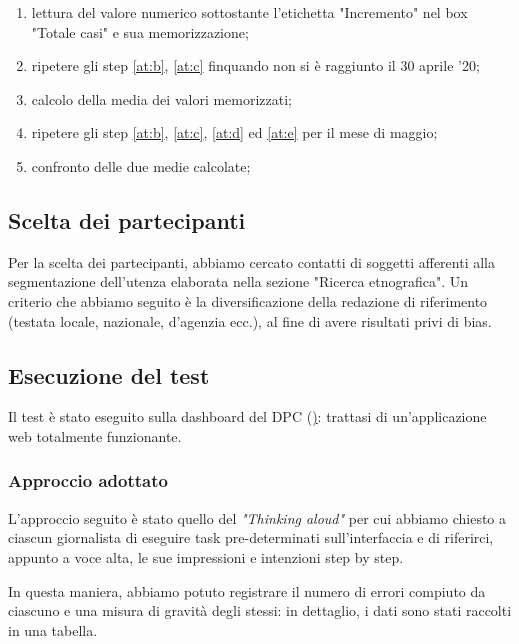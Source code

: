 \begin{enumerate}
\begin{enumerate}[label=\alph*.]
        \item lettura del valore numerico sottostante l'etichetta "Incremento" nel box "Totale casi" e sua memorizzazione; \label{at:c}
        \item ripetere gli step \ref{at:b}, \ref{at:c} finquando non si è raggiunto il 30 aprile '20; \label{at:d}
        \item calcolo della media dei valori memorizzati; \label{at:e}
        \item ripetere gli step \ref{at:b}, \ref{at:c}, \ref{at:d} ed \ref{at:e} per il mese di maggio; 
        \item confronto delle due medie calcolate;
    \end{enumerate}
\end{enumerate}

\subsection{Scelta dei partecipanti}
Per la scelta dei partecipanti, abbiamo cercato contatti di soggetti afferenti alla segmentazione dell'utenza elaborata nella sezione "Ricerca etnografica". Un criterio che abbiamo seguito è la diversificazione della redazione di riferimento (testata locale, nazionale, d'agenzia ecc.), al fine di avere risultati privi di bias.

\subsection{Esecuzione del test}
Il test è stato eseguito sulla dashboard del DPC (\href{https://opendatadpc.maps.arcgis.com/apps/opsdashboard/index.html#/b0c68bce2cce478eaac82fe38d4138b1}): trattasi di un'applicazione web totalmente funzionante.
\subsubsection{Approccio adottato}
L'approccio seguito è stato quello del \textit{"Thinking aloud"} per cui abbiamo chiesto a ciascun giornalista di eseguire task pre-determinati sull'interfaccia e di riferirci, appunto a voce alta, le sue impressioni e intenzioni step by step.

In questa maniera, abbiamo potuto registrare il numero di errori compiuto da ciascuno e una misura di gravità degli stessi: in dettaglio, i dati sono stati raccolti in una tabella.

